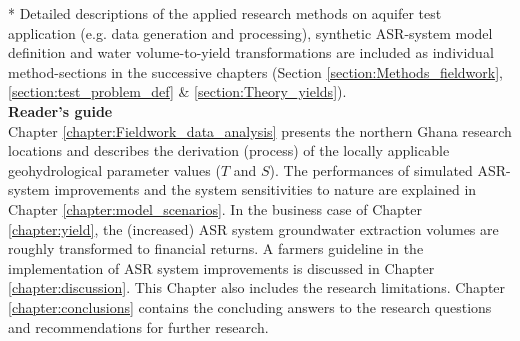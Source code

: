 * Detailed descriptions of the applied research methods on aquifer test application (e.g. data generation and processing), synthetic ASR-system model definition and water volume-to-yield transformations are included as individual method-sections in the successive chapters (Section \ref{section:Methods_fieldwork}, \ref{section:test_problem_def} \& \ref{section:Theory_yields}). \\



\textbf{Reader's guide}\\
Chapter \ref{chapter:Fieldwork_data_analysis} presents the northern Ghana research locations and describes the derivation (process) of the locally applicable geohydrological parameter values ($T$ and $S$). The performances of simulated ASR-system improvements and the system sensitivities to nature are explained in Chapter \ref{chapter:model_scenarios}. In the business case of Chapter \ref{chapter:yield}, the (increased) ASR system groundwater extraction volumes are roughly transformed to financial returns. A farmers guideline in the implementation of ASR system improvements is discussed in Chapter \ref{chapter:discussion}. This Chapter also includes the research limitations. Chapter \ref{chapter:conclusions} contains the concluding answers to the research questions and recommendations for further research.


